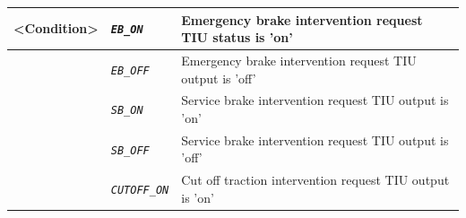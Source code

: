 \documentclass{template/openetcs}
\begin{document}
\begin{itemize}
\begin{longtable}{|l|l|l|}
			\hline
			
				\multirow{1}{*}{ \begin{minipage}[t]{0.22\linewidth} \textbf{<Condition>} \end{minipage} }
			&	\begin{minipage}[t]{0.40\linewidth} \emph{\texttt{EB\_ON}} \end{minipage}
			&	\begin{minipage}[t]{0.38\linewidth} Emergency brake intervention request TIU status is ’on’ \end{minipage} \\
			
			\hline			
			
			&	\begin{minipage}[t]{0.40\linewidth} \emph{\texttt{EB\_OFF}} \end{minipage}
			&	\begin{minipage}[t]{0.38\linewidth} Emergency brake intervention request TIU output is ’off’ \end{minipage} \\
			
			\hline
			
			&	\begin{minipage}[t]{0.40\linewidth} \emph{\texttt{SB\_ON}} \end{minipage}
			&	\begin{minipage}[t]{0.38\linewidth} Service brake intervention request TIU output is ’on’ \end{minipage} \\ 

			\hline

			&	\begin{minipage}[t]{0.40\linewidth} \emph{\texttt{SB\_OFF}} \end{minipage}
			&	\begin{minipage}[t]{0.38\linewidth} Service brake intervention request TIU output is ’off’ \end{minipage} \\ 

			\hline

			&	\begin{minipage}[t]{0.40\linewidth} \emph{\texttt{CUTOFF\_ON}} \end{minipage}
			&	\begin{minipage}[t]{0.38\linewidth} Cut off traction intervention request TIU output is ’on’ \end{minipage} \\ 


\end{longtable}
\end{itemize}
\end{document}
